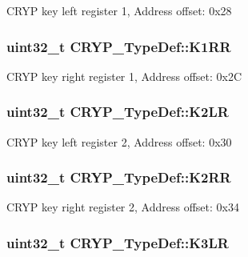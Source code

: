 C\-R\-Y\-P key left register 1, Address offset\-: 0x28 \hypertarget{struct_c_r_y_p___type_def_a496e0b1dee706ce76274ae74ee4e8095}{
\subsubsection[{K1\-R\-R}]{ uint32\-\_\-t C\-R\-Y\-P\-\_\-\-Type\-Def\-::\-K1\-R\-R}}\label{struct_c_r_y_p___type_def_a496e0b1dee706ce76274ae74ee4e8095}
C\-R\-Y\-P key right register 1, Address offset\-: 0x2\-C \hypertarget{struct_c_r_y_p___type_def_aa0dc0e8f97e7b7333083c1429c41bca8}{
\subsubsection[{K2\-L\-R}]{ uint32\-\_\-t C\-R\-Y\-P\-\_\-\-Type\-Def\-::\-K2\-L\-R}}\label{struct_c_r_y_p___type_def_aa0dc0e8f97e7b7333083c1429c41bca8}
C\-R\-Y\-P key left register 2, Address offset\-: 0x30 \hypertarget{struct_c_r_y_p___type_def_a96ef270d5244bd331fb8db5b0deffb4a}{
\subsubsection[{K2\-R\-R}]{ uint32\-\_\-t C\-R\-Y\-P\-\_\-\-Type\-Def\-::\-K2\-R\-R}}\label{struct_c_r_y_p___type_def_a96ef270d5244bd331fb8db5b0deffb4a}
C\-R\-Y\-P key right register 2, Address offset\-: 0x34 \hypertarget{struct_c_r_y_p___type_def_a39e099c27b2be81a03c09810f390454b}{
\subsubsection[{K3\-L\-R}]{ uint32\-\_\-t C\-R\-Y\-P\-\_\-\-Type\-Def\-::\-K3\-L\-R}}\label{struct_c_r_y_p___type_def_a39e099c27b2be81a03c09810f390454b}

